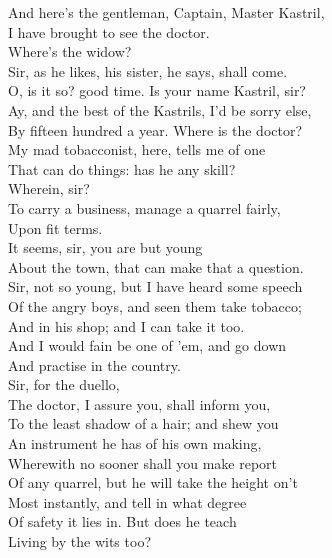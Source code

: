 \documentclass[a4paper,oneside,12pt]{memoir}
\begin{document}
\begin{drama*}
\druggerspeaks And here's the gentleman, Captain, Master Kastril,\\
I have brought to see the doctor.\\
\facespeaks {} Where's the widow?\\
\druggerspeaks Sir, as he likes, his sister, he says, shall come.\\
\facespeaks O, is it so? good time. Is your name Kastril, sir?\\
\kastrilspeaks Ay, and the best of the Kastrils, I'd be sorry else,\\
By fifteen hundred a year. Where is the doctor?\\
My mad tobacconist, here, tells me of one\\
That can do things: has he any skill?\\
\facespeaks {} Wherein, sir?\\
\kastrilspeaks To carry a business, manage a quarrel fairly,\\
Upon fit terms.\\
\facespeaks {} It seems, sir, you are but young\\
About the town, that can make that a question.\\
\kastrilspeaks Sir, not so young, but I have heard some speech\\
Of the angry boys, and seen them take tobacco;\\
And in his shop; and I can take it too.\\
And I would fain be one of 'em, and go down\\
And practise in the country.\\
\facespeaks {} Sir, for the duello,\\
The doctor, I assure you, shall inform you,\\
To the least shadow of a hair; and shew you\\
An instrument he has of his own making,\\
Wherewith no sooner shall you make report\\
Of any quarrel, but he will take the height on't\\
Most instantly, and tell in what degree\\
Of safety it lies in.
\kastrilspeaks {} But does he teach\\
Living by the wits too?\\

\end{drama*}
\end{document}
